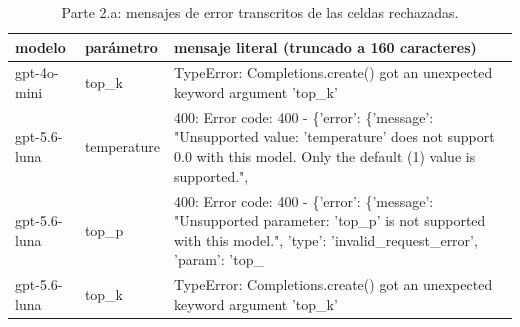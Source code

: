 \begin{table}[H]\centering\caption{Parte 2.a: mensajes de error transcritos de las celdas rechazadas.}\label{tab:p2ae}
{\footnotesize\setlength{\tabcolsep}{3.5pt}
\begin{tabular}{llp{7.5cm}}
\hline
modelo & parámetro & mensaje literal (truncado a 160 caracteres) \\
\hline
gpt-4o-mini & top\_k & TypeError: Completions.create() got an unexpected keyword argument 'top\_k' \\
gpt-5.6-luna & temperature & 400: Error code: 400 - \{'error': \{'message': "Unsupported value: 'temperature' does not support 0.0 with this model. Only the default (1) value is supported.",  \\
gpt-5.6-luna & top\_p & 400: Error code: 400 - \{'error': \{'message': "Unsupported parameter: 'top\_p' is not supported with this model.", 'type': 'invalid\_request\_error', 'param': 'top\_ \\
gpt-5.6-luna & top\_k & TypeError: Completions.create() got an unexpected keyword argument 'top\_k' \\
\hline
\end{tabular}
}\end{table}
